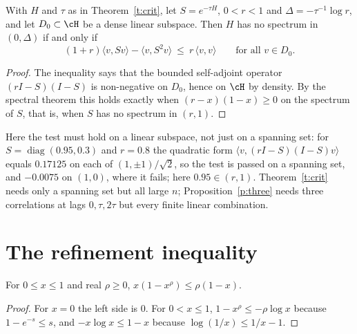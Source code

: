 \begin{proposition}\label{p:three}
With $H$ and $\tau$ as in Theorem~\ref{t:crit}, let $S=e^{-\tau H}$, $0<r<1$ and $\Delta=-\tau^{-1}\log r$, and let
$D_0\subset\cH$ be a dense linear subspace. Then $H$ has no spectrum in $(0,\Delta)$ if and only if
\[
(1+r)\langle v,Sv\rangle-\langle v,S^2v\rangle\ \le\ r\,\langle v,v\rangle\qquad\text{for all }v\in D_0 .
\]
\end{proposition}
\begin{proof}
The inequality says that the bounded self-adjoint operator $(rI-S)(I-S)$ is non-negative on $D_0$, hence on
$\cH$ by density. By the spectral theorem this holds exactly when $(r-x)(1-x)\ge0$ on the spectrum of $S$,
that is, when $S$ has no spectrum in $(r,1)$.
\end{proof}

\begin{remark}\label{r:three}
Here the test must hold on a linear subspace, not just on a spanning set: for $S=\operatorname{diag}(0.95,0.3)$
and $r=0.8$ the quadratic form $\langle v,(rI-S)(I-S)v\rangle$ equals $0.17125$ on each of $(1,\pm1)/\sqrt2$,
so the test is passed on a spanning set, and $-0.0075$ on $(1,0)$, where it fails; here $0.95\in(r,1)$. Theorem~\ref{t:crit} needs only a
spanning set but all large $n$; Proposition~\ref{p:three} needs three correlations at lags $0,\tau,2\tau$ but
every finite linear combination.
\end{remark}

\section{The refinement inequality}\label{s:inh}
\begin{lemma}\label{l:scal}
For $0\le x\le1$ and real $\rho\ge0$, $x(1-x^\rho)\le\rho(1-x)$.
\end{lemma}
\begin{proof}
For $x=0$ the left side is $0$. For $0<x\le1$, $1-x^\rho\le-\rho\log x$ because $1-e^{-s}\le s$, and
$-x\log x\le1-x$ because $\log(1/x)\le1/x-1$.
\end{proof}

